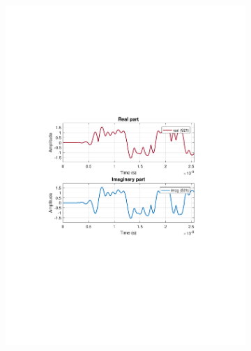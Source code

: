 \begin{refsection}
\begin{figure}[h!]
\centering
\begin{subfigure}{.5\textwidth}
  \centering
  \includegraphics[width=\linewidth]{./sdf/dsp_laser_phase_compensation/figures/S24_td_v2.pdf}
  \caption{}
  \label{fig:sub1}
\end{subfigure}%
\begin{subfigure}{.5\textwidth}
  \centering

\end{subfigure}
\end{figure}
\end{refsection}
